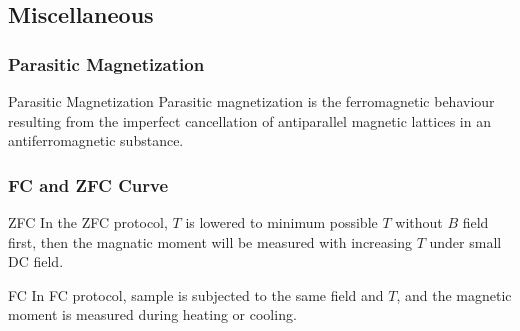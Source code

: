 \documentclass[hidelinks]{article}
\begin{document}
\subsection{Miscellaneous} %
\label{sub:miscellaneous}

\subsubsection{Parasitic Magnetization} %
\label{ssub:parasitic_magnetization}

\begin{termdef}{Parasitic Magnetization}
    Parasitic magnetization is the ferromagnetic behaviour resulting from the imperfect cancellation of antiparallel magnetic lattices in an antiferromagnetic substance.
\end{termdef}


\subsubsection{FC and ZFC Curve} %
\label{ssub:fc_and_zfc_curve}

\begin{termdef}{ZFC}
    In the ZFC protocol, $T$ is lowered to minimum possible $T$ without $B$ field first, then the magnatic moment will be measured with increasing $T$ under small DC field.
\end{termdef}
\begin{termdef}{FC}
    In FC protocol, sample is subjected to the same field and $T$, and the magnetic moment is measured during heating or cooling.
\end{termdef}



\end{document}
